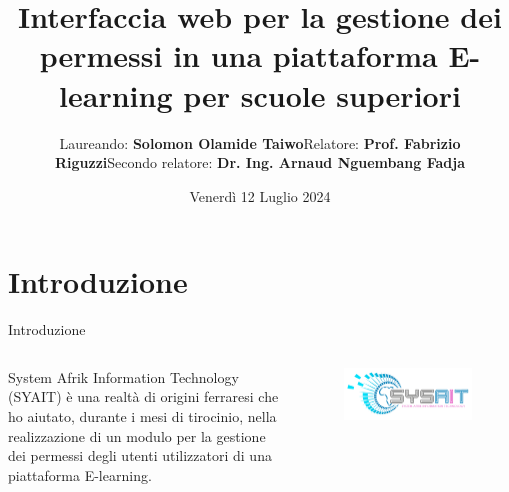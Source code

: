 \documentclass[aspectratio=169]{beamer}
\title[Gestione permessi]{Interfaccia web per la gestione dei permessi in una piattaforma E-learning per scuole superiori}
\author{Laureando: \textbf{Solomon Olamide Taiwo}\newline Relatore: \textbf{Prof. Fabrizio Riguzzi}\newline Secondo relatore: \textbf{Dr. Ing. Arnaud Nguembang Fadja}}
\institute{\newline Università degli Studi di Ferrara}
\date{Venerdì 12 Luglio 2024}
\begin{document}
\maketitle


\section{Introduzione}
\begin{frame}[fragile]{Introduzione}
	\begin{columns}[T] %
		\begin{column}{0.65\textwidth}
			System Afrik Information Technology (SYAIT) è una realtà di origini ferraresi che ho aiutato, durante i mesi di tirocinio,
			nella realizzazione di un modulo per la gestione dei permessi degli utenti utilizzatori di una piattaforma E-learning.
		\end{column}
		\begin{column}{0.35\textwidth}
			\begin{figure}[H]
				\centering
				\includegraphics[width=\textwidth]{../images/logo-syait.png}
			\end{figure}
		\end{column}
	\end{columns}

\end{frame}
\end{document}
